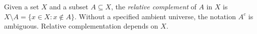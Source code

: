 
Given a set $X$ and a subset $A\subseteq X$, the \emph{relative complement} of $A$ in $X$ is $X\setminus A=\{x\in X:x\notin A\}$. Without a specified ambient universe, the notation $A^c$ is ambiguous. Relative complementation depends on $X$.
